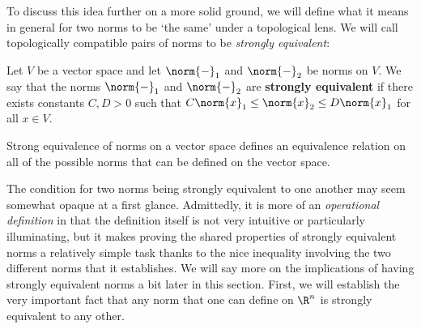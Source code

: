  \vspace{3mm}

 To discuss this idea further on a more solid ground, we will define what it means in general for two norms to be `the same' under a topological lens. We will call topologically compatible pairs of norms to be \emph{strongly equivalent}:
 
 \begin{definition}
   Let \( V \) be a vector space and let \( \norm{-}_1 \) and \( \norm{-}_2 \) be norms on \( V \). We say that the norms \( \norm{-}_1 \) and \( \norm{-}_2 \) are \textbf{strongly equivalent} if there exists constants \( C,D>0 \) such that \( C\norm{x}_1\leq \norm{x}_2\leq D\norm{x}_1 \) for all \( x\in V \).
 \end{definition}

 Strong equivalence of norms on a vector space defines an equivalence relation on all of the possible norms that can be defined on the vector space.

 \vspace{3mm}

 The condition for two norms being strongly equivalent to one another may seem somewhat opaque at a first glance. Admittedly, it is more of an \emph{operational definition} in that the definition itself is not very intuitive or particularly illuminating, but it makes proving the shared properties of strongly equivalent norms a relatively simple task thanks to the nice inequality involving the two different norms that it establishes. We will say more on the implications of having strongly equivalent norms a bit later in this section. First, we will establish the very important fact that any norm that one can define on \( \R^n \) is strongly equivalent to any other.

